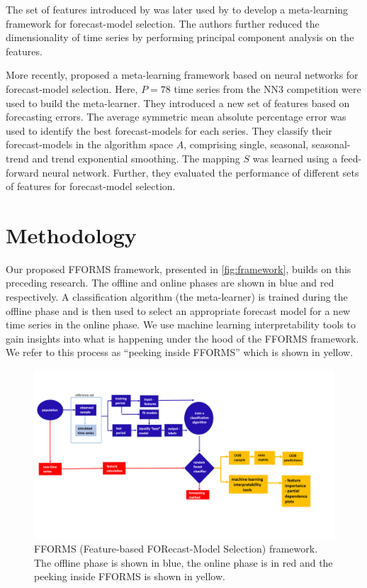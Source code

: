 \documentclass[11pt,a4paper,]{article}
\begin{document}
The set of features introduced by \textcite{wang2009rule} was later used by \textcite{widodomodel} to develop a meta-learning framework for forecast-model selection. The authors further reduced the dimensionality of time series by performing principal component analysis on the features.

More recently, \textcite{kuck2016meta} proposed a meta-learning framework based on neural networks for forecast-model selection. Here, \(P = 78\) time series from the NN3 competition were used to build the meta-learner. They introduced a new set of features based on forecasting errors. The average symmetric mean absolute percentage error was used to identify the best forecast-models for each series. They classify their forecast-models in the algorithm space \(A\), comprising single, seasonal, seasonal-trend and trend exponential smoothing. The mapping \(S\) was learned using a feed-forward neural network. Further, they evaluated the performance of different sets of features for forecast-model selection.

\hypertarget{fforms}{%
\section{Methodology}\label{fforms}}

Our proposed FFORMS framework, presented in \autoref{fig:framework}, builds on this preceding research. The offline and online phases are shown in blue and red respectively. A classification algorithm (the meta-learner) is trained during the offline phase and is then used to select an appropriate forecast model for a new time series in the online phase. We use machine learning interpretability tools to gain insights into what is happening under the hood of the FFORMS framework. We refer to this process as ``peeking inside FFORMS'' which is shown in yellow.

\begin{figure}

{\centering \includegraphics[width=1.1\linewidth]{images/framework} 

}

\caption{FFORMS (Feature-based FORecast-Model Selection) framework. The offline phase is shown in blue, the online phase is in red and the peeking inside FFORMS is shown in yellow.}\label{fig:framework}
\end{figure}
\end{document}
